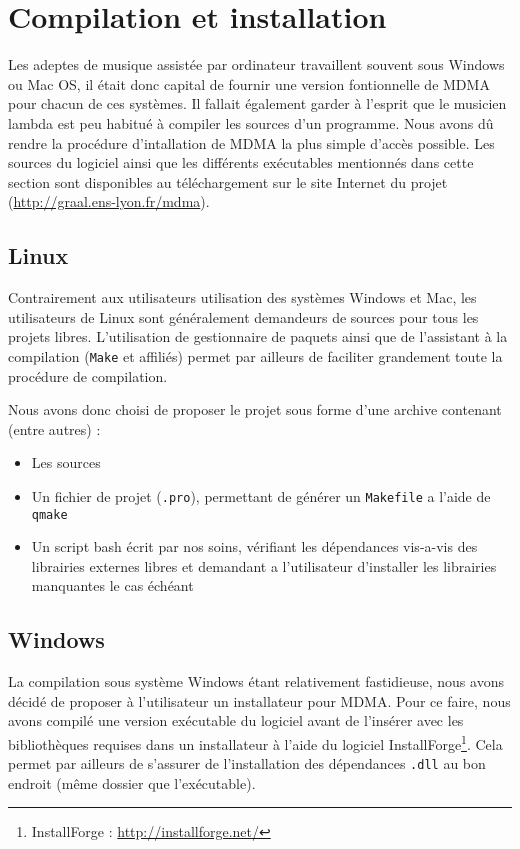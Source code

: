 \section{Compilation et installation}
\par Les adeptes de musique assistée par ordinateur travaillent souvent sous Windows ou Mac OS, il était donc capital de fournir une version fontionnelle de MDMA pour chacun de ces systèmes. Il fallait également garder à l'esprit que le musicien lambda est peu habitué à compiler les sources d'un programme. Nous avons dû rendre la procédure d'intallation de MDMA la plus simple d'accès possible. Les sources du logiciel ainsi que les différents exécutables mentionnés dans cette section sont disponibles au téléchargement sur le site Internet du projet (\url{http://graal.ens-lyon.fr/mdma}).
\subsection{Linux}
\par Contrairement aux utilisateurs utilisation des systèmes Windows et Mac, les utilisateurs de Linux sont généralement demandeurs de sources pour tous les projets libres. L'utilisation de gestionnaire de paquets ainsi que de l'assistant à la compilation (\texttt{Make} et affiliés) permet par ailleurs de faciliter grandement toute la procédure de compilation.
\par Nous avons donc choisi de proposer le projet sous forme d'une archive contenant (entre autres) :
\begin{itemize}
    \item Les sources
    \item Un fichier de projet (\texttt{.pro}), permettant de générer un \texttt{Makefile} a l'aide de \texttt{qmake}
    \item Un script bash écrit par nos soins, vérifiant les dépendances vis-a-vis des librairies externes libres et demandant a l'utilisateur d'installer les librairies manquantes le cas échéant
\end{itemize}
\subsection{Windows}
\par La compilation sous système Windows étant relativement fastidieuse, nous avons décidé de proposer à l'utilisateur un installateur pour MDMA. Pour ce faire, nous avons compilé une version exécutable du logiciel avant de l'insérer avec les bibliothèques requises dans un installateur à l'aide du logiciel InstallForge\footnote{InstallForge : \url{http://installforge.net/}}. Cela permet par ailleurs de s'assurer de l'installation des dépendances \texttt{.dll} au bon endroit (même dossier que l'exécutable).
